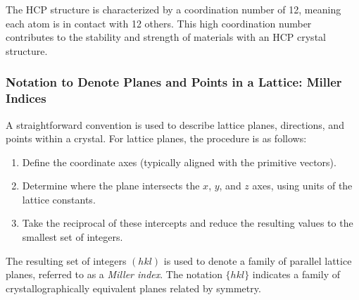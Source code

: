 The HCP structure is characterized by a coordination number of 12, meaning each atom is in contact with 12 others. This high coordination number contributes to the stability and strength of materials with an HCP crystal structure.

\subsubsection{Notation to Denote Planes and Points in a Lattice: Miller Indices}
A straightforward convention is used to describe lattice planes, directions, and points within a crystal. For lattice planes, the procedure is as follows:

\begin{enumerate}
	\item Define the coordinate axes (typically aligned with the primitive vectors).
	\item Determine where the plane intersects the $x$, $y$, and $z$ axes, using units of the lattice constants.
	\item Take the reciprocal of these intercepts and reduce the resulting values to the smallest set of integers.
\end{enumerate}

The resulting set of integers $(hkl)$ is used to denote a family of parallel lattice planes, referred to as a \textit{Miller index}. The notation $\{hkl\}$ indicates a family of crystallographically equivalent planes related by symmetry.

